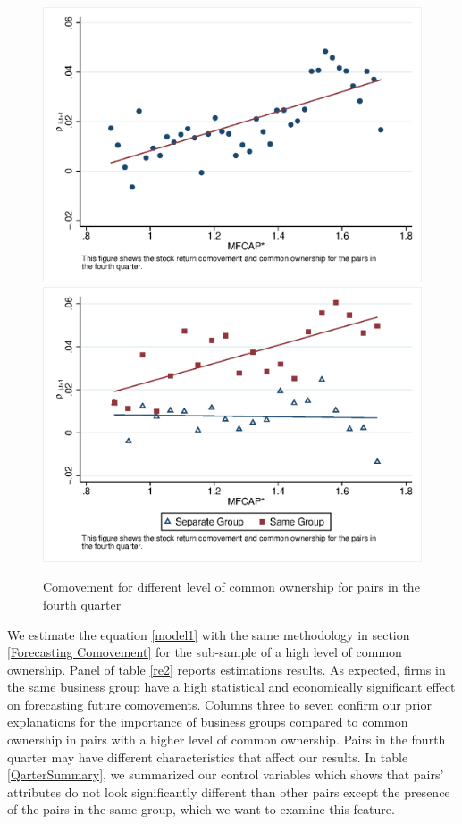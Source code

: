 			
						\begin{figure}[htbp]
							\centerfloat
							\includegraphics[width=0.55\linewidth]{"Output/Qmcorr5subsample.eps"}
							\includegraphics[width=0.55\linewidth]{"Output/Qmcorr5lrdbgsubsample.eps"}
							\caption{Comovement for different level of common ownership for pairs in the fourth quarter}
								\label{Qmcorr5subsample}
						\end{figure}
			
			
	
	We estimate the equation \ref{model1} with the same methodology in section \ref{Forecasting Comovement}  for the sub-sample of a high level of common ownership. Panel  of table \ref{re2}  reports estimations results. As expected, firms in the same business group have a high statistical and economically significant effect on forecasting future comovements. Columns three to seven confirm our prior explanations for the importance of business groups compared to common ownership in pairs with a higher level of common ownership. Pairs in the fourth quarter may have different characteristics that affect our results.  In table \ref{QarterSummary}, we summarized our control variables which shows that pairs' attributes do not look significantly different than other pairs except the presence of the pairs in the same group, which we want to examine this feature.
	
